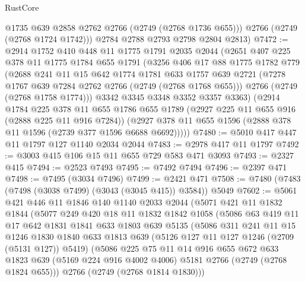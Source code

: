 \begin{lexlean}{RustCore}
\begin{coremodule}
          @1735
          @639
          @2858
          @2762
          @2766
          (@2749 (@2768 @1736 @655)))
        @2766
        (@2749 (@2768 @1724 @1742)))
      @2784
      @2788
      @2793
      @2798
      @2804
      @2813)
@7472 := @2914
    @1752
    @410
    @448
    @11
    @1775
    @1791
    @2035
    @2044
    (@2651
      @407
      @225
      @378
      @11
      @1775
      @1784
      @655
      @1791
      (@3256
        @406
        @17
        @88
        @1775
        @1782
        @779
        (@2688
          @241
          @11
          @15
          @642
          @1774
          @1781
          @633
          @1757
          @639
          @2721
          (@7278 @1767 @639 @7284 @2762 @2766 (@2749 (@2768 @1768 @655)))
          @2766
          (@2749 (@2768 @1758 @1774)))
        @3342
        @3345
        @3348
        @3352
        @3357
        @3363)
      (@2914
        @1784
        @225
        @378
        @11
        @655
        @1786
        @655
        @1789
        (@2927 @225 @11 @655 @916 (@2888 @225 @11 @916 @7284))
        (@2927 @378 @11 @655 @1596 (@2888 @378 @11 @1596 (@2739 @377 @1596 @6688 @6692)))))
@7480 := @5010 @417 @447 @11 @1797 @127 @1140 @2034 @2044
@7483 := @2978 @417 @11 @1797
@7492 := @3003 @415 @106 @15 @11 @655 @729 @583 @471 @3093
@7493 := @2327 @415
@7494 := @2523 @7493
@7495 := @7492 @7494
@7496 := @2397 @471
@7498 := @7495 (@3034 @7496)
@7499 := @2421 @471
@7508 := @7480 (@7483 (@7498 (@3038 @7499) (@3043 (@3045 @415)) @3584)) @5049
@7602 := @5061
    @421
    @446
    @11
    @1846
    @140
    @1140
    @2033
    @2044
    (@5071
      @421
      @11
      @1832
      @1844
      (@5077
        @249
        @420
        @18
        @11
        @1832
        @1842
        @1058
        (@5086
          @63
          @419
          @11
          @17
          @642
          @1831
          @1841
          @633
          @1803
          @639
          @5135
          (@5086
            @311
            @241
            @11
            @15
            @1246
            @1830
            @1840
            @633
            @1813
            @639
            (@5126 @127 @11 @127 @1246 (@2709 (@5131 @127)) @5419)
            (@5086
              @225
              @75
              @11
              @14
              @916
              @655
              @672
              @633
              @1823
              @639
              (@5169 @224 @916 @4002 @4006)
              @5181
              @2766
              (@2749 (@2768 @1824 @655)))
            @2766
            (@2749 (@2768 @1814 @1830)))

\end{coremodule}
\end{lexlean}
